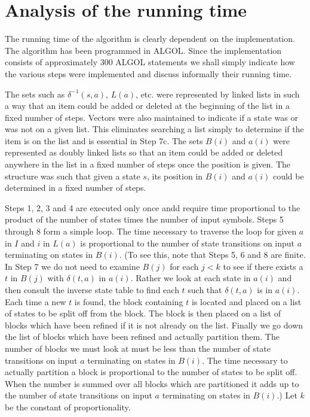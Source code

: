 \section{Analysis of the running time}

The running time of the algorithm is clearly dependent on the implementation. The algorithm has been
programmed in ALGOL. Since the implementation consists of approximately 300 ALGOL statements we shall simply
indicate how the various steps were implemented and discuss informally their running time.

The sets such as $\delta^{-1} (s, a)$, $L(a)$, etc. were represented by linked lists in such a way that an item
could be added or deleted at the beginning of the list in a fixed number of steps. Vectors were also
maintained to indicate if a state was or was not on a given list. This eliminates searching a list simply
to determine if the item is on the list and is essential in Step 7c. The sets $B(i)$ and $a(i)$ were
represented as doubly linked lists so that an item could be added or deleted anywhere in the list in a fixed
number of steps once the position is given. The structure was such that given a state $s$, its position in
$B(i)$ and $a(i)$ could be determined in a fixed number of steps.

Steps 1, 2, 3 and 4 are executed only once andd require time proportional to the product of the number of
states times the number of input symbols. Steps 5 through 8 form a simple loop. The time necessary to
traverse the loop for given $a$ in $I$ and $i$ in $L(a)$ is proportional to the number of state transitions
on input $a$ terminating on states in $B(i)$. (To see this, note that Steps 5, 6 and 8 are finite. In
Step 7 we do not need to examine $B(j)$ for each $j < k$ to see if there exists a $t$ in $B(j)$ with $\delta (t, a)$
in $a(i)$. Rather we look at each state in $a(i)$ and then consult the inverse state table to find each $t$
such that $\delta (t, a)$ is in $a(i)$. Each time a new $t$ is found, the block containing $t$ is located and
placed on a list of states to be split off from the block. The block is then placed on a list of blocks
which have been refined if it is not already on the list. Finally we go down the list of blocks which have
been refined and actually partition them. The number of blocks we must look at must be less than the number
of state transitions on input $a$ terminating on states in $B(i)$. The time necessary to actually partition
a block is proportional to the number of states to be split off. When the number is summed over all blocks
which are partitioned it adds up to the number of state transitions on input $a$ terminating on states in
$B(i)$.) Let $k$ be the constant of proportionality.

